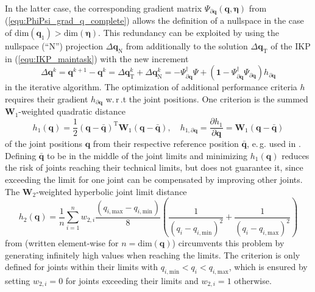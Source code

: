 \documentclass[robotics,article,submit,moreauthors,pdftex]{Definitions/mdpi}
\newcommand{\bm}[1]{\boldsymbol{#1}}
\newcommand{\transp}[0]{{\mathrm{T}}}
\let\Psi\varPsi
\begin{document}
In the latter case, the corresponding gradient matrix $\bm{\Psi}_{\partial \bm{q}}(\bm{q},\bm{\eta})$ from (\ref{equ:PhiPsi_grad_q_complete}) allows the definition of a nullspace in the case of $\mathrm{dim}(\bm{q}_1)>\mathrm{dim}(\bm{\eta})$.
This redundancy can be exploited by using the nullspace (``N'') projection ${\Delta}\bm{q}_{\mathrm{N}}$ from \cite{Yoshikawa1984} additionally to the solution ${\Delta}\bm{q}_{\mathrm{T}}$ of the IKP in (\ref{equ:IKP_maintask}) with the new increment
%
\begin{equation}
{\Delta}\bm{q}^{k}
=
\bm{q}^{k+1} - \bm{q}^k
=
{\Delta}\bm{q}_{\mathrm{T}}^k + {\Delta}\bm{q}_{\mathrm{N}}^k
=
-\bm{\Psi}_{\partial\bm{q}}^{\dagger} \bm{\Psi} +  (\bm{1}-\bm{\Psi}_{\partial\bm{q}}^{\dagger}\bm{\Psi}_{\partial\bm{q}}) h_{\partial\bm{q}}
\label{equ:nullspace}
\end{equation}
%
in the iterative algorithm.
The optimization of additional performance criteria $h$ requires their gradient $h_{\partial\bm{q}}$ w.\,r\,.t the joint positions.
One criterion is the summed $\bm{W}_1$-weighted quadratic distance
%
\begin{equation}
h_1(\bm{q})
=
\frac{1}{2} (\bm{q}-\bar{\bm{q}})^\transp\bm{W}_1(\bm{q}-\bar{\bm{q}}),
\quad
h_{1,\partial\bm{q}}
=
\frac{\partial h_1}{\partial \bm{q}}
=
\bm{W}_1(\bm{q}-\bar{\bm{q}})
\label{equ:criterion1}
\end{equation}
%
of the joint positions $\bm{q}$ from their respective reference position $\bar{\bm{q}}$, e.\,g. used in \cite{HuoBar2005,HuoBar2008}.
Defining $\bar{\bm{q}}$ to be in the middle of the joint limits and minimizing $h_1(\bm{q})$ reduces the risk of joints reaching their technical limits, but does not guarantee it, since exceeding the limit for one joint can be compensated by improving other joints.
The $\bm{W}_{2}$-weighted hyperbolic joint limit distance
%
\begin{equation}
h_2(\bm{q})
=
\frac{1}{n} \sum_{i=1}^{n}
w_{2,i}
\frac{(q_{i,\mathrm{max}}-q_{i,\mathrm{min}})}{8}
\left(
\frac{1}{(q_{i}-q_{i,\mathrm{min}})^2}
+
\frac{1}{(q_{i}-q_{i,\mathrm{max}})^2}
\right)
\label{equ:criterion2}
\end{equation}
%
from \cite{ZhuQuCaoYan2013} (written element-wise for $n=\mathrm{dim}(\bm{q})$) circumvents this problem by generating infinitely high values when reaching the limits.
The criterion is only defined for joints within their limits with $q_{i,\mathrm{min}} < q_i < q_{i,\mathrm{max}}$, which is ensured by setting $w_{2,i}=0$ for joints exceeding their limits and $w_{2,i}=1$ otherwise.
\end{document}
